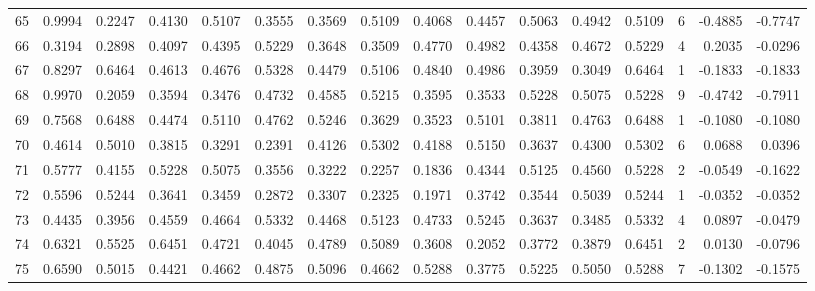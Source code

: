 \begin{tabular}{lrrrrrrrrrrrrrrr}
65  &      0.9994 &  0.2247 &  0.4130 &  0.5107 &  0.3555 &  0.3569 &  0.5109 &  0.4068 &  0.4457 &  0.5063 &   0.4942 &     0.5109 &      6 &                   -0.4885 &                    -0.7747 \\
66  &      0.3194 &  0.2898 &  0.4097 &  0.4395 &  0.5229 &  0.3648 &  0.3509 &  0.4770 &  0.4982 &  0.4358 &   0.4672 &     0.5229 &      4 &                    0.2035 &                    -0.0296 \\
67  &      0.8297 &  0.6464 &  0.4613 &  0.4676 &  0.5328 &  0.4479 &  0.5106 &  0.4840 &  0.4986 &  0.3959 &   0.3049 &     0.6464 &      1 &                   -0.1833 &                    -0.1833 \\
68  &      0.9970 &  0.2059 &  0.3594 &  0.3476 &  0.4732 &  0.4585 &  0.5215 &  0.3595 &  0.3533 &  0.5228 &   0.5075 &     0.5228 &      9 &                   -0.4742 &                    -0.7911 \\
69  &      0.7568 &  0.6488 &  0.4474 &  0.5110 &  0.4762 &  0.5246 &  0.3629 &  0.3523 &  0.5101 &  0.3811 &   0.4763 &     0.6488 &      1 &                   -0.1080 &                    -0.1080 \\
70  &      0.4614 &  0.5010 &  0.3815 &  0.3291 &  0.2391 &  0.4126 &  0.5302 &  0.4188 &  0.5150 &  0.3637 &   0.4300 &     0.5302 &      6 &                    0.0688 &                     0.0396 \\
71  &      0.5777 &  0.4155 &  0.5228 &  0.5075 &  0.3556 &  0.3222 &  0.2257 &  0.1836 &  0.4344 &  0.5125 &   0.4560 &     0.5228 &      2 &                   -0.0549 &                    -0.1622 \\
72  &      0.5596 &  0.5244 &  0.3641 &  0.3459 &  0.2872 &  0.3307 &  0.2325 &  0.1971 &  0.3742 &  0.3544 &   0.5039 &     0.5244 &      1 &                   -0.0352 &                    -0.0352 \\
73  &      0.4435 &  0.3956 &  0.4559 &  0.4664 &  0.5332 &  0.4468 &  0.5123 &  0.4733 &  0.5245 &  0.3637 &   0.3485 &     0.5332 &      4 &                    0.0897 &                    -0.0479 \\
74  &      0.6321 &  0.5525 &  0.6451 &  0.4721 &  0.4045 &  0.4789 &  0.5089 &  0.3608 &  0.2052 &  0.3772 &   0.3879 &     0.6451 &      2 &                    0.0130 &                    -0.0796 \\
75  &      0.6590 &  0.5015 &  0.4421 &  0.4662 &  0.4875 &  0.5096 &  0.4662 &  0.5288 &  0.3775 &  0.5225 &   0.5050 &     0.5288 &      7 &                   -0.1302 &                    -0.1575 \\

\end{tabular}
